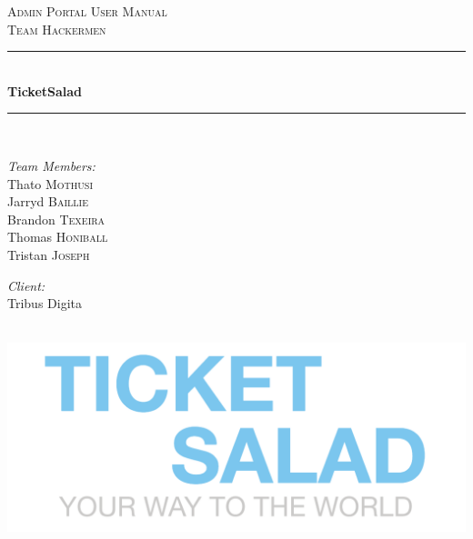 \documentclass[11pt]{article}
\begin{document}
		\begin{titlepage}
			
			\newcommand{\HRule}{\rule{\linewidth}{0.5mm}} 
			
			\center 
			
			\textsc{\LARGE Admin Portal User Manual}\\[0.5cm] 
			\textsc{\Large Team Hackermen}\\[0.5cm] 
			
			\HRule \\[0.4cm]
			{ \huge \bfseries TicketSalad}\\[0.4cm] 
			\HRule \\[1.5cm]
			
			\begin{minipage}{0.4\textwidth}
				\begin{flushleft} \large
					\emph{Team Members:}\\
					Thato \textsc{Mothusi}\\
					Jarryd \textsc{Baillie}\\
					Brandon \textsc{Texeira}\\
					Thomas \textsc{Honiball}\\
					Tristan \textsc{Joseph}\\
				\end{flushleft}
			\end{minipage}
			
			\begin{minipage}{0.4\textwidth}
				\begin{flushright} \large
					\emph{Client:} \\
					Tribus Digita 
				\end{flushright}
			\end{minipage}\\[2cm]
			
			\includegraphics{logo.png}\\[1cm] 
			
		\end{titlepage}
	
\end{document}
